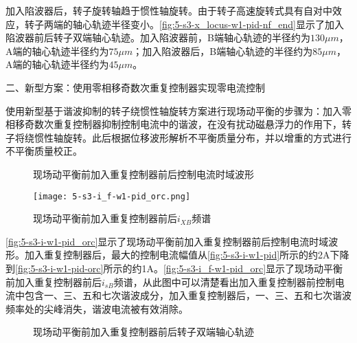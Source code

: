\documentclass[
  lang=cn,
  degree=master,
  openany,oneside
]{nuaathesis}
\begin{document}
加入陷波器后，转子旋转轴趋于惯性轴旋转。由于转子高速旋转式具有自对中效应，转子两端的轴心轨迹半径变小。\autoref{fig:5-s3-x_locus-w1-pid-nf_end}显示了加入陷波器前后转子双端轴心轨迹。加入陷波器前，B端轴心轨迹的半径约为$130 \mu m$，A端的轴心轨迹半径约为$75 \mu m$；加入陷波器后，B端轴心轨迹的半径约为$85 \mu m$，A端的轴心轨迹半径约为$45 \mu m$。




二、新型方案：使用零相移奇数次重复控制器实现零电流控制

使用新型基于谐波抑制的转子绕惯性轴旋转方案进行现场动平衡的步骤为：加入零相移奇数次重复控制器抑制控制电流中的谐波，在没有扰动磁悬浮力的作用下，转子将绕惯性轴旋转。此后根据位移波形解析不平衡质量分布，并以增重的方式进行不平衡质量校正。

\begin{figure}[h!]  
	\quad  
	\caption{现场动平衡前加入重复控制器前后控制电流时域波形}  \label{fig:5-s3-i-w1-pid_orc}
\end{figure}

\begin{figure}[h!]
	\texttt{[image: 5-s3-i\_f-w1-pid\_orc.png]}
	\caption{现场动平衡前加入重复控制器前后$i_{XB}$频谱}
	\label{fig:5-s3-i_f-w1-pid_orc}
\end{figure}

\autoref{fig:5-s3-i-w1-pid_orc}显示了现场动平衡前加入重复控制器前后控制电流时域波形。加入重复控制器后，最大的控制电流幅值从\autoref{fig:5-s3-i-w1-pid}所示的约2A下降到\autoref{fig:5-s3-i-w1-pid-orc}所示的约1A。\autoref{fig:5-s3-i_f-w1-pid_orc}显示了现场动平衡前加入重复控制器前后$i_{sB}$频谱，从此图中可以清楚看出加入重复控制器前控制电流中包含一、三、五和七次谐波成分，加入重复控制器后，一、三、五和七次谐波频率处的尖峰消失，谐波电流被有效消除。

\begin{figure}[h!]  
	\quad  
	\caption{现场动平衡前加入重复控制器前后转子双端轴心轨迹}  \label{fig:5-s3-x_locus-w1-pid-orc_end}
\end{figure}
\end{document}
